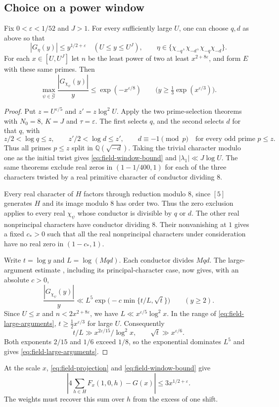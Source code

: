 \subsection{Choice on a power window}

\begin{proposition}\label{prop:field-window}
Fix $0<\varepsilon<1/52$ and $J>1$. For every sufficiently large
$U$, one can choose $q,d$ as above so that
\begin{equation}\label{eq:field-window-bound}
  |G_\eta(y)|\le y^{1/2+\varepsilon}\quad(U\le y\le U^J),\qquad
  \eta\in\{\chi_{-q},\chi_{-d},\chi_{-q}\chi_{-d}\}.
\end{equation}
For each $x\in[U,U^J]$ let $n$ be the least power of two at least
$x^{2+8\varepsilon}$, and form $E$ with these same primes. Then
\begin{equation}\label{eq:field-large-arguments}
  \max_{\psi\in\widehat{\mathcal G}}\frac{|G_{\chi_\psi}(y)|}{y}
    \le \exp(-x^{\varepsilon/8})
    \qquad\bigl(y\ge\tfrac13\exp(x^{\varepsilon/3})\bigr).
\end{equation}
\end{proposition}

\begin{proof}
Put $z=U^{\varepsilon/5}$ and $z'=z\log^2 U$. Apply the two
prime-selection theorems \citep[Theorems~5.10 and~5.12]{adriazola-grh}
with $N_0=8$, $K=J$ and $\tau=\varepsilon$. The first selects $q$,
and the second selects $d$ for that $q$, with
\[
  z/2<\log q\le z,\qquad z'/2<\log d\le z',\qquad
  d\equiv-1\pmod p\quad\text{for every odd prime }p\le z.
\]
Thus all primes $p\le z$ split in $\mathbb Q(\sqrt{-d})$.
Taking the trivial character modulo one as the initial twist gives
\eqref{eq:field-window-bound} and $|\lambda_1|\ll J\log U$. The same
theorems exclude real zeros in $(1-1/400,1)$ for each of the three
characters twisted by a real primitive character of conductor dividing
$8$.

Every real character of $H$ factors through reduction modulo $8$,
since $[5]$ generates $H$ and its image modulo $8$ has order two.
Thus the zero exclusion applies to every real $\chi_\psi$ whose
conductor is divisible by $q$ or $d$. The other real nonprincipal
characters have conductor dividing $8$. Their nonvanishing at $1$
gives a fixed $c_*>0$ such that all the real nonprincipal characters
under consideration have no real zero in $(1-c_*,1)$.

Write $t=\log y$ and $L=\log(Mqd)$. Each conductor divides $Mqd$.
The large-argument estimate \citep[Proposition~5.3 and the following
paragraph]{adriazola-grh}, including its principal-character case,
now gives, with an absolute $c>0$,
\[
  \frac{|G_{\chi_\psi}(y)|}{y}
  \ll L^5\exp\!\bigl(-c\min\{t/L,\sqrt t\}\bigr)
  \qquad(y\ge2).
\]
Since $U\le x$ and $n<2x^{2+8\varepsilon}$, we have
$L\ll x^{\varepsilon/5}\log^2 x$. In the range of
\eqref{eq:field-large-arguments}, $t\ge\tfrac12 x^{\varepsilon/3}$ for
large $U$. Consequently
\[
  t/L\gg x^{2\varepsilon/15}/\log^2 x,\qquad
  \sqrt t\gg x^{\varepsilon/6}.
\]
Both exponents $2/15$ and $1/6$ exceed $1/8$, so the exponential
dominates $L^5$ and gives \eqref{eq:field-large-arguments}.
\end{proof}

At the scale $x$, \eqref{eq:field-projection} and
\eqref{eq:field-window-bound} give
\[
  \left|4\sum_{h\in H}F_x(1,0,h)-G(x)\right|
     \le 3x^{1/2+\varepsilon}.
\]
The weights must recover this sum over $h$ from the excess of one shift.
